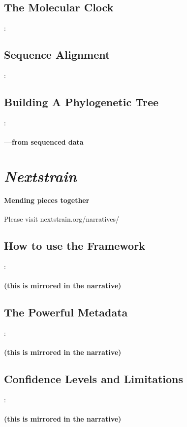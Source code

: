 \documentclass{beamer}
\begin{document}
\begin{darkframes}
    \subsection{The Molecular Clock}
    \begin{frame}{\secname : \subsecname}
      \framesubtitle{}
    \end{frame}

    \subsection{Sequence Alignment}
    \begin{frame}{\secname : \subsecname}
      \framesubtitle{}
    \end{frame}

    \subsection{Building A Phylogenetic Tree}
    \begin{frame}{\secname : \subsecname}
      \framesubtitle{---from sequenced data}
    \end{frame}

  \section{\textit{Nextstrain}}

    \begin{frame}{\secname}
      \framesubtitle{Mending pieces together}
      Please visit nextstrain.org/narratives/
    \end{frame}

    \subsection{How to use the Framework}
    \begin{frame}{\secname : \subsecname}
      \framesubtitle{(this is mirrored in the narrative)}
    \end{frame}

    \subsection{The Powerful Metadata}
    \begin{frame}{\secname : \subsecname}
      \framesubtitle{(this is mirrored in the narrative)}
    \end{frame}

    \subsection{Confidence Levels and Limitations}
    \begin{frame}{\secname : \subsecname}
      \framesubtitle{(this is mirrored in the narrative)}
    \end{frame}


\end{darkframes}
\end{document}
